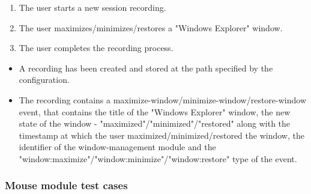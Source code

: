 \begin{tests}
	{\begin{enumerate}
		\item The \gls{user} starts a new \gls{session} recording.
		\item The \gls{user} maximizes/minimizes/restores a "Windows Explorer" window.
		\item The \gls{user} completes the recording process.
	\end{enumerate}}
	{\begin{itemize}
		\item A recording has been created and stored at the path specified by the configuration.
		\item The recording contains a maximize-window/minimize-window/restore-window \gls{event},  that contains the title of the "Windows Explorer" window, the new state of the window - "maximized"/"minimized"/"restored" along with the timestamp at which the \gls{user} maximized/minimized/restored the window, the identifier of the window-management module and the "window:maximize"/"window:minimize"/"window:restore" type of the event.
	\end{itemize}}
\end{tests}

\newpage
\subsubsection{Mouse module test cases}

